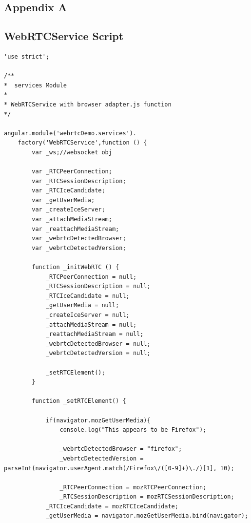 \appendix
{}
 \renewcommand{\chaptername}{\appendixname}
 
\begin{appendices}

\chapter{Appendix A}

\section{WebRTCService Script} 
\label{app:webrtc_service}

\begin{lstlisting}[caption={WebRTCService.js in application client},label={code:webrtc_service}]
'use strict';

/**
*  services Module
*
* WebRTCService with browser adapter.js function
*/

angular.module('webrtcDemo.services').
	factory('WebRTCService',function () {
		var _ws;//websocket obj
		
		var _RTCPeerConnection;
		var _RTCSessionDescription;
		var _RTCIceCandidate;
		var _getUserMedia;
		var _createIceServer;
		var _attachMediaStream;
		var _reattachMediaStream;
		var _webrtcDetectedBrowser;
		var _webrtcDetectedVersion;

		function _initWebRTC () {
			_RTCPeerConnection = null;
			_RTCSessionDescription = null;
			_RTCIceCandidate = null;
			_getUserMedia = null;
			_createIceServer = null;
			_attachMediaStream = null;
			_reattachMediaStream = null;
			_webrtcDetectedBrowser = null;
			_webrtcDetectedVersion = null;

			_setRTCElement();
		}

		function _setRTCElement() {

			if(navigator.mozGetUserMedia){
				console.log("This appears to be Firefox");

				_webrtcDetectedBrowser = "firefox";
				_webrtcDetectedVersion = parseInt(navigator.userAgent.match(/Firefox\/([0-9]+)\./)[1], 10);

				_RTCPeerConnection = mozRTCPeerConnection;
				_RTCSessionDescription = mozRTCSessionDescription;
  			_RTCIceCandidate = mozRTCIceCandidate;
  			_getUserMedia = navigator.mozGetUserMedia.bind(navigator);


\end{lstlisting}
\end{appendices}
